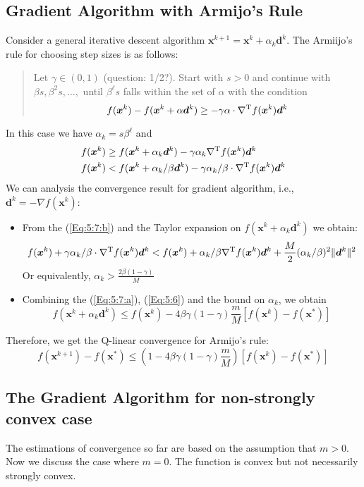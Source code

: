 \subsection{Gradient Algorithm with Armijo's Rule}
Consider a general iterative descent algorithm $\bm x^{k+1} = \bm x^k + \alpha_k\bm d^k$. The Armiijo's rule for choosing step sizes is as follows:
\begin{quotation}
Let $\gamma\in(0,1)$ (question: 1/2?). Start with $s>0$ and continue with $\beta s,\beta^2s,\dots,$ until $\beta^{\ell}s$ falls within the set of $\alpha$ with the condition
\[
f(\bm x^k) - f(\bm x^k + \alpha\bm d^k) \ge -\gamma \alpha\cdot \nabla^{\mathrm T} f(\bm x^k)\bm d^k
\]
\end{quotation}
In this case we have $\alpha_k = s\beta^{\ell}$ and
\begin{subequations}
\begin{align}
f(\bm x^k)&\ge f(\bm x^k +\alpha_k\bm d^k) - \gamma\alpha_k \nabla^{\mathrm T} f(\bm x^k)\bm d^k\label{Eq:5:7:a}\\
f(\bm x^k)&< f(\bm x^k +\alpha_k/\beta \bm d^k) - \gamma \alpha_k/\beta\cdot \nabla^{\mathrm T} f(\bm x^k)\bm d^k\label{Eq:5:7:b}
\end{align}
\end{subequations}
We can analysis the convergence result for gradient algorithm, i.e., $\bm d^k = -\nabla f(\bm x^k)$:
\begin{itemize}
\item
From the (\ref{Eq:5:7:b}) and the Taylor expansion on $f(\bm x^k +\alpha_k\bm d^k)$ we obtain:
\[
f(\bm x^k)+\gamma \alpha_k/\beta\cdot \nabla^{\mathrm T} f(\bm x^k)\bm d^k<f(\bm x^k)+\alpha_k/\beta \nabla^{\mathrm T} f(\bm x^k)\bm d^k + \frac{M}{2}(\alpha_k/\beta)^2\|\bm d^k\|^2
\]
Or equivalently, $\alpha_k>\frac{2\beta(1-\gamma)}{M}$
\item
Combining the (\ref{Eq:5:7:a}), (\ref{Eq:5:6}) and the bound on $\alpha_k$, we obtain
\[
f(\bm x^k+\alpha_k\bm d^k)\le f(\bm x^k) - 4\beta\gamma(1-\gamma)\frac{m}{M}[f(\bm x^k) - f(\bm x^*)]
\]
\end{itemize}

Therefore, we get the Q-linear convergence for Armijo's rule:
\[
f(\bm x^{k+1}) - f(\bm x^*)\le \left(1-4\beta\gamma(1-\gamma)\frac{m}{M}\right)[f(\bm x^k) - f(\bm x^*)]
\]


\subsection{The Gradient Algorithm for non-strongly convex case}
The estimations of convergence so far are based on the assumption that $m>0$. Now we discuss the case where $m=0$. The function is convex but not necessarily strongly convex.


